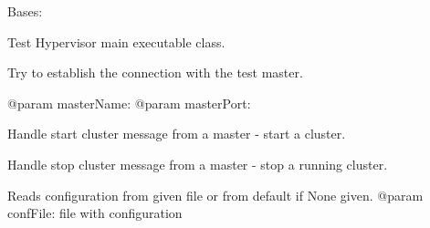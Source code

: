 \documentclass[letterpaper,10pt,english]{sphinxmanual}
\begin{document}
\begin{fulllineitems}
\label{ref-manual/XrdTestHypervisor:XrdTestHypervisor.XrdTestHypervisor}
Bases: {\hyperref[ref-manual/XrdTest:XrdTest.Daemon.Runnable]{}}

Test Hypervisor main executable class.

\begin{fulllineitems}
\label{ref-manual/XrdTestHypervisor:XrdTestHypervisor.XrdTestHypervisor.connectMaster}
Try to establish the connection with the test master.

@param masterName:
@param masterPort:

\end{fulllineitems}


\begin{fulllineitems}
\label{ref-manual/XrdTestHypervisor:XrdTestHypervisor.XrdTestHypervisor.handleStartCluster}
Handle start cluster message from a master - start a cluster.

\end{fulllineitems}


\begin{fulllineitems}
\label{ref-manual/XrdTestHypervisor:XrdTestHypervisor.XrdTestHypervisor.handleStopCluster}
Handle stop cluster message from a master - stop a running cluster.

\end{fulllineitems}


\begin{fulllineitems}
\label{ref-manual/XrdTestHypervisor:XrdTestHypervisor.XrdTestHypervisor.readConfig}
Reads configuration from given file or from default if None given.
@param confFile: file with configuration


\end{fulllineitems}
\end{fulllineitems}
\end{document}
